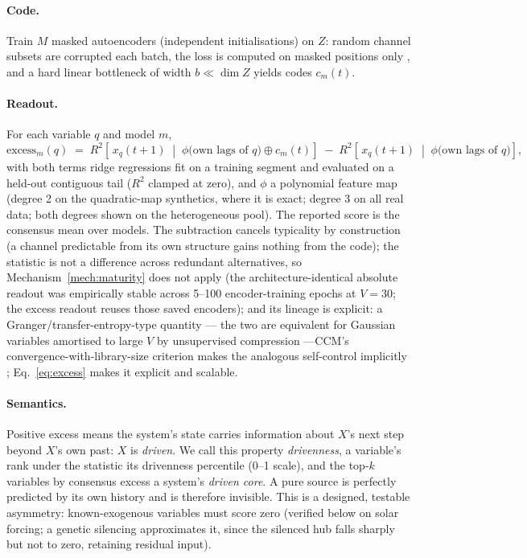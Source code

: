 \documentclass[11pt]{article}
\begin{document}
\paragraph{Code.} Train $M$ masked autoencoders (independent
initialisations) on $Z$: random channel subsets are corrupted each batch,
the loss is computed on masked positions only \citep{he2022mae}, and a hard
linear bottleneck of width $b \ll \dim Z$ yields codes $c_m(t)$.

\paragraph{Readout.} For each variable $q$ and model $m$,
\begin{equation}
\mathrm{excess}_m(q) \;=\;
R^2\!\left[\,x_q(t{+}1)\;\middle|\;\phi\big(\text{own lags of } q\big)\oplus
c_m(t)\right]
\;-\;
R^2\!\left[\,x_q(t{+}1)\;\middle|\;\phi\big(\text{own lags of }
q\big)\right],
\label{eq:excess}
\end{equation}
with both terms ridge regressions fit on a training segment and evaluated
on a held-out contiguous tail ($R^2$ clamped at zero), and $\phi$ a
polynomial feature map (degree 2 on the quadratic-map synthetics, where it
is exact; degree 3 on all real data; both degrees shown on the
heterogeneous pool). The reported score is the consensus mean
over models. The subtraction cancels typicality by construction (a channel
predictable from its own structure gains nothing from the code); the
statistic is not a difference across redundant alternatives, so
Mechanism~\ref{mech:maturity} does not apply (the architecture-identical
absolute readout was empirically stable across 5--100 encoder-training
epochs at $V{=}30$; the excess readout reuses those saved encoders); and
its lineage is explicit: a Granger/transfer-entropy-type quantity
\citep{granger1969,schreiber2000,barnett2009} --- the two are equivalent
for Gaussian variables \citep{barnett2009}
amortised to large $V$ by unsupervised compression
\citep{janzing2010}---CCM's
convergence-with-library-size criterion makes the analogous self-control
implicitly \citep{sugihara2012}; Eq.~\ref{eq:excess} makes it explicit and
scalable.

\paragraph{Semantics.} Positive excess means the system's state carries
information about $X$'s next step beyond $X$'s own past: $X$ is
\emph{driven}. We call this property \emph{drivenness}, a variable's rank
under the statistic its drivenness percentile (0--1 scale), and the
top-$k$ variables by consensus excess a system's \emph{driven core}. A pure source is perfectly predicted by its own history and
is therefore invisible. This is a designed, testable asymmetry:
known-exogenous
variables must score zero (verified below on solar forcing; a genetic
silencing approximates it, since the silenced hub falls sharply but not
to zero, retaining residual input).
\end{document}
